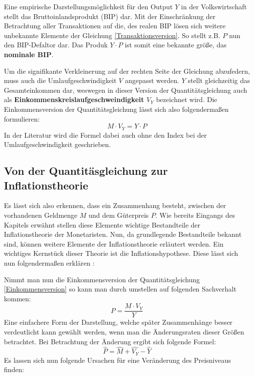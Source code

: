 Eine empirische Darstellungsmöglichkeit für den Output $Y$ in der Volkswirtschaft stellt das Bruttoinlandsprodukt (BIP) dar. Mit der Einschränkung der Betrachtung aller Transaktionen auf die, des realen BIP lösen sich weitere unbekannte Elemente der Gleichung \vref{Transaktionsversion}. So stellt z.B. $P$ nun den BIP-Defaltor dar. Das Produk $Y \cdot P$ ist somit eine bekannte größe, das \textbf{nominale BIP}\autocite*[125]{mankiw2017}.

Um die signifikante Verkleinerung auf der rechten Seite der Gleichung abzufedern, muss auch die Umlaufgeschwindigkeit $V$ angepasst werden. $Y$ stellt gleichzeitig das Gesamteinkommen dar, weswegen in dieser Version der Quantitätsgleichung auch als \textbf{Einkommenskreislaufgeschweindigkeit $V_Y$} bezeichnet wird. Die Einkommensversion der Quantitätsgleichung lässt sich also folgendermaßen formulieren:
\begin{equation}
    \tag{Einkommensversion}
    M \cdot V_Y = Y \cdot P
\end{equation}\label{Einkommensversion}
In der Literatur wird die Formel dabei auch ohne den Index bei der Umlaufgeschwindigkeit geschrieben.

\subsection{Von der Quantitäsgleichung zur Inflationstheorie}

Es lässt sich also erkennen, dass ein Zusammenhang besteht, zwischen der vorhandenen Geldmenge $M$ und dem Güterpreis $P$. Wie bereits Eingangs des Kapitels erwähnt stellen diese Elemente wichtige Bestandteile der Inflationstheorie der Monetaristen. Nun, da grundlegende Bestandteile bekannt sind, können weitere Elemente der Inflationstheorie erläutert werden. Ein wichtiges Kernstück dieser Theorie ist die Inflationshypothese. Diese lässt sich nun folgendermaßen erklären \autocite{defMon}:

Nimmt man nun die Einkommensversion der Quantitätsgleichung \vref{Einkommensversion} so kann man durch umstellen auf folgenden Sachverhalt kommen:
$$ P = \frac{M \cdot V_Y}{Y} $$
Eine einfachere Form der Darstellung, welche später Zusammenhänge besser verdeutlicht kann gewählt werden, wenn man die Änderungsraten dieser Größen betrachtet. Bei Betrachtung der Änderung ergibt sich folgende Formel:
$$ \widehat{P} = \widehat{M} + \widehat{V_Y} - \widehat{Y} $$
Es lassen sich nun folgende Ursachen für eine Veränderung des Preisniveaus finden:

